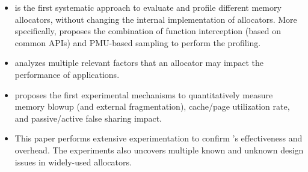 \begin{itemize}
\item \MP{} is the first systematic approach to evaluate and profile different memory allocators, without changing the internal implementation of allocators. More specifically, \MP{} proposes the combination of function interception (based on common APIs) and PMU-based sampling to perform the profiling.


\item \MP{} analyzes multiple relevant factors that an allocator may impact the performance of applications.

\item \MP{} proposes the first experimental mechanisms to quantitatively measure memory blowup (and external fragmentation), cache/page utilization rate, and passive/active false sharing impact. 
\item This paper performs extensive experimentation to confirm \MP{}'s effectiveness and overhead. The experiments also uncovers multiple known and unknown design issues in widely-used allocators.  

\end{itemize} 


